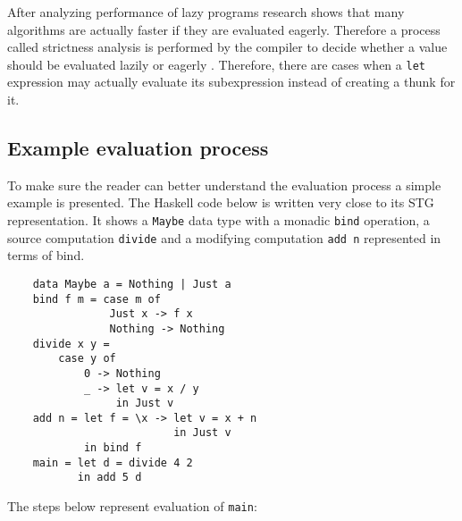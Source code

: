\documentclass[en]{pracamgr}
\begin{document}
After analyzing performance of lazy programs research shows that
many algorithms are actually faster if they are evaluated eagerly.
Therefore a process called strictness analysis is
performed by the compiler to decide whether a value should be
evaluated lazily or eagerly \cite{demand_analysis}.
Therefore, there are cases when a \texttt{let} expression
may actually evaluate its subexpression instead of creating a thunk for it.

\subsection{Example evaluation process}\label{s:example_eval}

To make sure the reader can better understand the
evaluation process a simple example is presented.
The Haskell code below is written very close to its STG representation.
It shows a \texttt{Maybe} data type with a monadic \texttt{bind} operation,
a source computation \texttt{divide} and a modifying
computation \texttt{add n} represented in terms of bind.

\begin{verbatim}
    data Maybe a = Nothing | Just a
    bind f m = case m of
                Just x -> f x
                Nothing -> Nothing
    divide x y =
        case y of
            0 -> Nothing
            _ -> let v = x / y
                 in Just v
    add n = let f = \x -> let v = x + n 
                          in Just v
            in bind f
    main = let d = divide 4 2
           in add 5 d
\end{verbatim}

The steps below represent evaluation of \texttt{main}:
\end{document}
